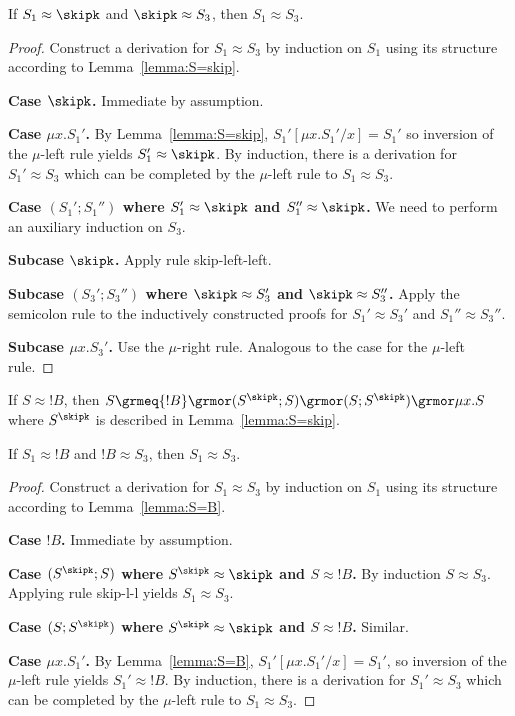 \begin{lemma}\label{lemma:trans-skip}
  If $S_1 \approx \skipk$ and $\skipk \approx S_3$, then $S_1 \approx S_3$.
\end{lemma}
\begin{proof}
  Construct a derivation for $S_1\approx S_3$ by induction on $S_1$
  using its structure according to Lemma~\ref{lemma:S=skip}.

  \textbf{Case $\skipk$.} Immediate by assumption.

  \textbf{Case $\mu x.S_1'$.} By  Lemma~\ref{lemma:S=skip}, $S_1'[\mu
  x.S_1'/x] = S_1'$ so inversion of the $\mu$-left rule yields $S_1'
  \approx \skipk$. By induction, there is a derivation for $S_1'
  \approx S_3$ which can be completed by the $\mu$-left rule to $S_1
  \approx S_3$.

  \textbf{Case $(S_1';S_1'')$ where $S_1' \approx \skipk$ and $S_1''
    \approx \skipk$.} We need to perform an auxiliary induction on
  $S_3$.

  \textbf{Subcase $\skipk$.} Apply rule skip-left-left.

  \textbf{Subcase $(S_3'; S_3'')$ where $\skipk \approx S_3'$ and
    $\skipk \approx S_3''$.} Apply the semicolon rule to the
  inductively constructed proofs for $S_1' \approx S_3'$ and $S_1''
  \approx S_3''$.

  \textbf{Subcase $\mu x. S_3'$.} Use the $\mu$-right rule. Analogous
  to the case for the $\mu$-left rule.
\end{proof}

\begin{lemma}\label{lemma:S=B}
  If $S \approx {!B}$, then $S \grmeq {!B} \grmor (S^{\skipk};
  S)\grmor (S; S^{\skipk}) \grmor \mu x.S$ where $S^{\skipk}$ is
  described in Lemma~\ref{lemma:S=skip}.
\end{lemma}

\begin{lemma}
  If $S_1 \approx {!B}$ and ${!B} \approx S_3$, then $S_1 \approx S_3$.  
\end{lemma}
\begin{proof}
  Construct a derivation for $S_1 \approx S_3$ by induction on $S_1$
  using its structure according to Lemma~\ref{lemma:S=B}.

  \textbf{Case $!B$.} Immediate by assumption.

  \textbf{Case $(S^{\skipk}; S)$ where $S^{\skipk}\approx \skipk$ and
    $S \approx{!B}$.} By induction $S \approx S_3$. Applying rule
  skip-l-l yields $S_1 \approx S_3$.

  \textbf{Case $(S; S^{\skipk})$ where $S^{\skipk}\approx \skipk$ and
    $S \approx{!B}$.} Similar.

  \textbf{Case $\mu x.S_1'$.} By Lemma~\ref{lemma:S=B}, $S_1'[\mu
  x.S_1'/x] = S_1'$, so inversion of the $\mu$-left rule yields $S_1'
  \approx {!B}$. By induction, there is a derivation for $S_1'
  \approx S_3$ which can be completed by the $\mu$-left rule to $S_1
  \approx S_3$.
\end{proof}

